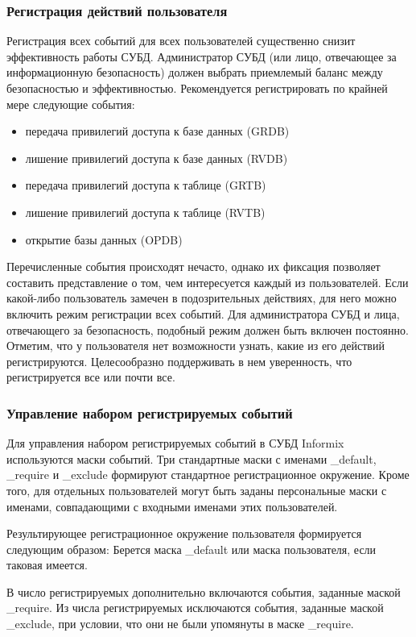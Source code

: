 \subsubsection{Регистрация действий пользователя}
Регистрация всех событий для всех пользователей существенно снизит эффективность работы СУБД. Администратор СУБД (или лицо, отвечающее за информационную безопасность) должен выбрать приемлемый баланс между безопасностью и эффективностью.
Рекомендуется регистрировать по крайней мере следующие события:
\begin{itemize}
    \item передача привилегий доступа к базе данных (GRDB)
    \item лишение привилегий доступа к базе данных (RVDB)
    \item передача привилегий доступа к таблице (GRTB)
    \item лишение привилегий доступа к таблице (RVTB)
    \item открытие базы данных (OPDB)
\end{itemize}

Перечисленные события происходят нечасто, однако их фиксация позволяет составить представление о том, чем интересуется каждый из пользователей. Если какой-либо пользователь замечен в подозрительных действиях, для него можно включить режим регистрации всех событий. Для администратора СУБД и лица, отвечающего за безопасность, подобный режим должен быть включен постоянно.
Отметим, что у пользователя нет возможности узнать, какие из его действий регистрируются. Целесообразно поддерживать в нем уверенность, что регистрируется все или почти все.

\subsubsection{Управление набором регистрируемых событий}

Для управления набором регистрируемых событий в СУБД Informix используются маски событий. Три стандартные маски с именами \_default, \_require и \_exclude формируют стандартное регистрационное окружение. Кроме того, для отдельных пользователей могут быть заданы персональные маски с именами, совпадающими с входными именами этих пользователей.

Результирующее регистрационное окружение пользователя формируется следующим образом:
Берется маска \_default или маска пользователя, если таковая имеется.

В число регистрируемых дополнительно включаются события, заданные маской \_require.
Из числа регистрируемых исключаются события, заданные маской \_exclude, при условии, что они не были упомянуты в маске \_require.

